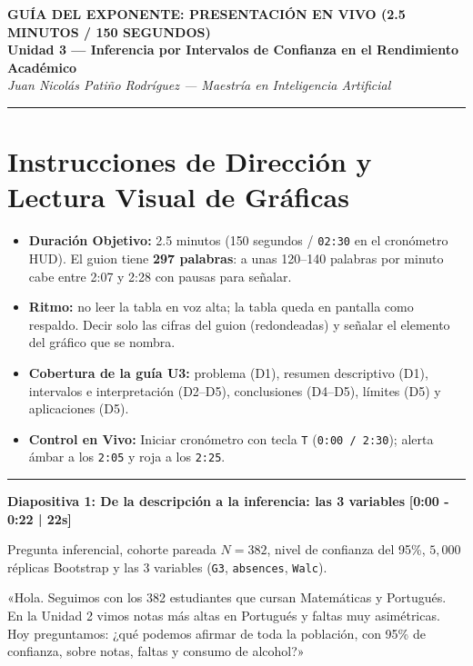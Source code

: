 \documentclass[11pt,a4paper]{article}
\begin{document}
\begin{center}
  {\fontsize{15}{19}\selectfont \color{sabanaBlue}\bfseries GUÍA DEL EXPONENTE: PRESENTACIÓN EN VIVO (2.5 MINUTOS / 150 SEGUNDOS)}\\[0.2cm]
  {\fontsize{12}{15}\selectfont \color{darkGrey}\bfseries Unidad 3 — Inferencia por Intervalos de Confianza en el Rendimiento Académico}\\[0.1cm]
  {\color{accentGrey}\itshape Juan Nicolás Patiño Rodríguez — Maestría en Inteligencia Artificial}\\[0.4cm]
  \hrule
\end{center}

\vspace{0.2cm}

\section*{Instrucciones de Dirección y Lectura Visual de Gráficas}
\begin{itemize}[noitemsep,topsep=0pt]
  \item \textbf{Duración Objetivo:} 2.5 minutos (150 segundos / \texttt{02:30} en el cronómetro HUD). El guion tiene \textbf{297 palabras}: a unas 120--140 palabras por minuto cabe entre 2:07 y 2:28 con pausas para señalar.
  \item \textbf{Ritmo:} no leer la tabla en voz alta; la tabla queda en pantalla como respaldo. Decir solo las cifras del guion (redondeadas) y señalar el elemento del gráfico que se nombra.
  \item \textbf{Cobertura de la guía U3:} problema (D1), resumen descriptivo (D1), intervalos e interpretación (D2--D5), conclusiones (D4--D5), límites (D5) y aplicaciones (D5).
  \item \textbf{Control en Vivo:} Iniciar cronómetro con tecla \texttt{T} (\texttt{0:00 / 2:30}); alerta ámbar a los \texttt{2:05} y roja a los \texttt{2:25}.
\end{itemize}

\hrule

\vspace{0.35cm}

\noindent
\textbf{\large Diapositiva 1: De la descripción a la inferencia: las 3 variables} \hfill \textcolor{timeRed}{\textbf{[0:00 - 0:22 | 22s]}}
\begin{description}[noitemsep,topsep=2pt]
  \item[Visual en Pantalla:] Pregunta inferencial, cohorte pareada $N = 382$, nivel de confianza del 95\%, $5{,}000$ réplicas Bootstrap y las 3 variables (\texttt{G3}, \texttt{absences}, \texttt{Walc}).
  \item[Guion de Voz (45 palabras):]
    «Hola. Seguimos con los 382 estudiantes que cursan Matemáticas y Portugués. En la Unidad 2 vimos notas más altas en Portugués y faltas muy asimétricas. Hoy preguntamos: ¿qué podemos afirmar de toda la población, con 95\% de confianza, sobre notas, faltas y consumo de alcohol?»
\end{description}
\end{document}
